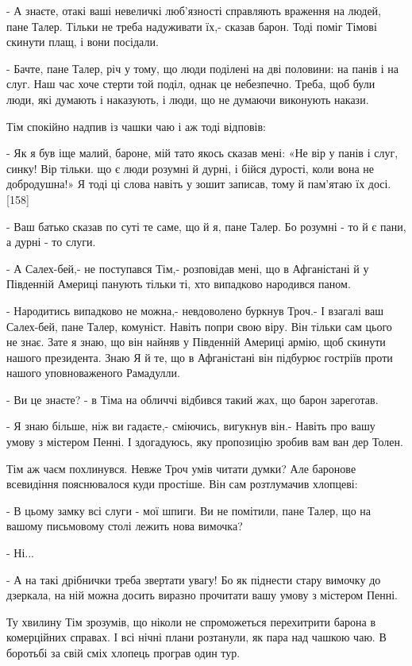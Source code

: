 - А знаєте, отакі ваші невеличкі люб'язності справляють враження на людей, пане Талер. Тільки не треба надуживати їх,- сказав барон. Тоді поміг Тімові скинути плащ, і вони посідали.

- Бачте, пане Талер, річ у тому, що люди поділені на дві половини: на панів і на слуг. Наш час хоче стерти той поділ, однак це небезпечно. Треба, щоб були люди, які думають і наказують, і люди, що не думаючи виконують накази.

Тім спокійно надпив із чашки чаю і аж тоді відповів:

- Як я був іще малий, бароне, мій тато якось сказав мені: «Не вір у панів і слуг, синку! Вір тільки. що є люди розумні й дурні, і бійся дурості, коли вона не добродушна!» Я тоді ці слова навіть у зошит записав, тому й пам'ятаю їх досі. [158]

- Ваш батько сказав по суті те саме, що й я, пане Талер. Бо розумні - то й є пани, а дурні - то слуги.

- А Салех-бей,- не поступався Тім,- розповідав мені, що в Афганістані й у Південній Америці панують тільки ті, хто випадково народився паном.

- Народитись випадково не можна,- невдоволено буркнув Троч.- І взагалі ваш Салех-бей, пане Талер, комуніст. Навіть попри свою віру. Він тільки сам цього не знає. Зате я знаю, що він найняв у Південній Америці армію, щоб скинути нашого президента. Знаю Я й те, що в Афганістані він підбурює гостріїв проти нашого уповноваженого Рамадулли.

- Ви це знаєте? - в Тіма на обличчі відбився такий жах, що барон зареготав.

- Я знаю більше, ніж ви гадаєте,- сміючись, вигукнув він.- Навіть про вашу умову з містером Пенні. І здогадуюсь, яку пропозицію зробив вам ван дер Толен.

Тім аж чаєм похлинувся. Невже Троч умів читати думки? Але баронове всевидіння пояснювалося куди простіше. Він сам розтлумачив хлопцеві:

- В цьому замку всі слуги - мої шпиги. Ви не помітили, пане Талер, що на вашому письмовому столі лежить нова вимочка?

- Ні...

- А на такі дрібнички треба звертати увагу! Бо як піднести стару вимочку до дзеркала, на ній можна досить виразно прочитати вашу умову з містером Пенні.

Ту хвилину Тім зрозумів, що ніколи не спроможеться перехитрити барона в комерційних справах. І всі нічні плани розтанули, як пара над чашкою чаю. В боротьбі за свій сміх хлопець програв один тур.

